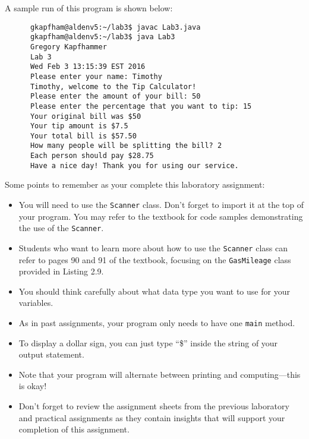 \noindent
A sample run of this program is shown below:

\begin{verbatim}
      gkapfham@aldenv5:~/lab3$ javac Lab3.java
      gkapfham@aldenv5:~/lab3$ java Lab3
      Gregory Kapfhammer
      Lab 3
      Wed Feb 3 13:15:39 EST 2016
      Please enter your name: Timothy
      Timothy, welcome to the Tip Calculator!
      Please enter the amount of your bill: 50
      Please enter the percentage that you want to tip: 15
      Your original bill was $50
      Your tip amount is $7.5
      Your total bill is $57.50
      How many people will be splitting the bill? 2
      Each person should pay $28.75
      Have a nice day! Thank you for using our service.

\end{verbatim}
\vspace{-0.2in}
Some points to remember as your complete this laboratory assignment:

\begin{itemize}
  \setlength{\itemsep}{0pt}

\item You will need to use the {\tt Scanner} class. Don't forget to import it at the top of your program. You may refer to
  the textbook for code samples demonstrating the use of the {\tt Scanner}.

\item Students who want to learn more about how to use the {\tt Scanner} class can refer to pages 90 and 91 of the
  textbook, focusing on the {\tt GasMileage} class provided in Listing 2.9.

\item You should think carefully about what data type you want to use for your variables.

\item As in past assignments, your program only needs to have one {\tt main} method.

\item To display a dollar sign, you can just type ``\$'' inside the string of your output statement.

\item Note that your program will alternate between printing and computing---this
is okay!

\item Don't forget to review the assignment sheets from the previous laboratory and practical assignments as they
  contain insights that will support your completion of this assignment.

\end{itemize}

